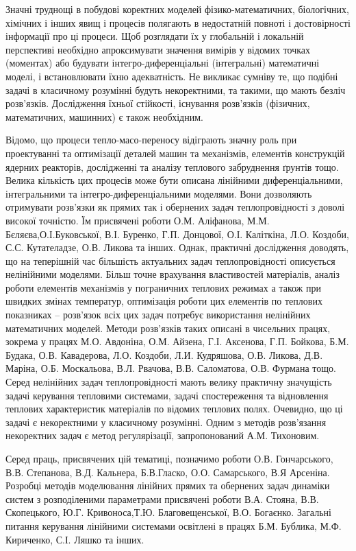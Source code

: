 {\actuality} Значні труднощі в побудові коректних моделей фізико-математичних, біологічних, хімічних і інших явищ і
процесів полягають в недостатній повноті і достовірності інформації про ці процеси. Щоб розглядати їх у глобальній і
локальній перспективі необхідно апроксимувати значення вимірів у відомих точках (моментах) або будувати
інтегро-диференціальні (інтегральні) математичні моделі, і встановлювати їхню адекватність. Не викликає сумніву те,
що подібні задачі в класичному розумінні будуть некоректними, та такими, що мають безліч розв’язків. Дослідження
їхньої стійкості, існування розв’язків (фізичних, математичних, машинних) є також необхідним.

Відомо, що процеси тепло-масо-переносу відіграють значну роль при проектуванні та оптимізації деталей машин та
механізмів, елементів конструкцій ядерних реакторів, дослідженні та аналізу теплового забруднення ґрунтів тощо.
Велика кількість цих процесів може бути описана лінійними диференціальними, інтегральними та інтегро-диференціальними
моделями. Вони дозволяють отримувати розв’язки як прямих так і обернених задач теплопровідності з доволі високої
точністю. Їм присвячені роботи О.М. Аліфанова, М.М. Бєляєва,О.І.Буковської, В.І. Буренко, Г.П. Донцової, О.І.
Каліткіна, Л.О. Коздоби, С.С. Кутателадзе, О.В. Ликова та інших. Однак, практичні дослідження доводять, що на
теперішній час більшість актуальних задач теплопровідності описується нелінійними моделями. Більш точне врахування
властивостей матеріалів, аналіз роботи елементів механізмів у пограничних теплових режимах а також при швидких
змінах температур, оптимізація роботи цих елементів по теплових показниках – розв’язок всіх цих задач потребує
використання нелінійних математичних моделей. Методи розв’язків таких описані в чисельних працях, зокрема у працях
М.О. Авдоніна, О.М. Айзена, Г.І. Аксенова, Г.П. Бойкова, Б.М. Будака, О.В. Кавадерова, Л.О. Коздоби, Л.И. Кудряшова,
О.В. Ликова, Д.В. Маріна, О.Б. Москальова,  В.Л. Рвачова, В.В. Саломатова, О.В. Фурмана тощо.
Серед нелінійних задач теплопровідності мають велику практичну значущість задачі керування тепловими системами,
задачі спостереження та відновлення теплових характеристик матеріалів по відомих теплових полях. Очевидно, що ці
задачі є некоректними у класичному розумінні. Одним з методів розв’язання некоректних  задач є метод регулярізації,
запропонований А.М. Тихоновим.

Серед праць, присвячених цій тематиці, позначимо  роботи О.В. Гончарського, В.В.
Степанова, В.Д. Кальнера, Б.В.Гласко, О.О. Самарського, В.Я  Арсеніна. Розробці методів моделювання лінійних прямих
та обернених задач динаміки систем з розподіленими параметрами присвячені роботи В.А. Стояна, В.В. Скопецького,
Ю.Г. Кривоноса,Т.Ю. Благовещенської, В.О. Богаєнко. Загальні питання керування лінійними системами освітлені в
працях Б.М. Бублика, М.Ф. Кириченко, С.І. Ляшко та інших.

